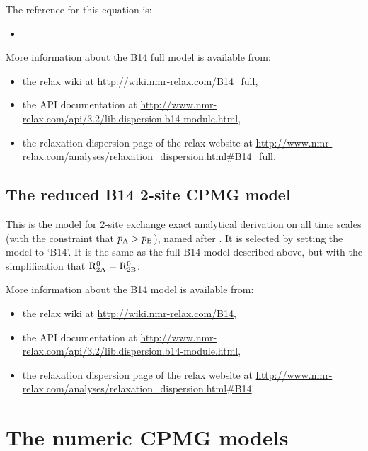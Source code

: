 The reference for this equation is:
\begin{itemize}
  \item {}
\end{itemize}

More information about the B14 full model is available from:
\begin{itemize}
  \item the relax wiki at \url{http://wiki.nmr-relax.com/B14\_full},
  \item the API documentation at \url{http://www.nmr-relax.com/api/3.2/lib.dispersion.b14-module.html},
  \item the relaxation dispersion page of the relax website at \url{http://www.nmr-relax.com/analyses/relaxation\_dispersion.html#B14\_full}.
\end{itemize}



\subsection{The reduced B14 2-site CPMG model}
\label{sect: dispersion: B14 model}

This is the model for 2-site exchange exact analytical derivation on all time scales (with the constraint that $p_{\textrm{A}} > p_{\textrm{B}}$), named after \citet{Baldwin2014}.
It is selected by setting the model to `B14'.
It is the same as the full B14 model described above, but with the simplification that $\mathrm{R}_{\mathrm{2A}}^0 = \mathrm{R}_{\mathrm{2B}}^0$.

More information about the B14 model is available from:
\begin{itemize}
  \item the relax wiki at \url{http://wiki.nmr-relax.com/B14},
  \item the API documentation at \url{http://www.nmr-relax.com/api/3.2/lib.dispersion.b14-module.html},
  \item the relaxation dispersion page of the relax website at \url{http://www.nmr-relax.com/analyses/relaxation\_dispersion.html#B14}.
\end{itemize}



\section{The numeric CPMG models}
\label{sect: dispersion: numeric CPMG models}

